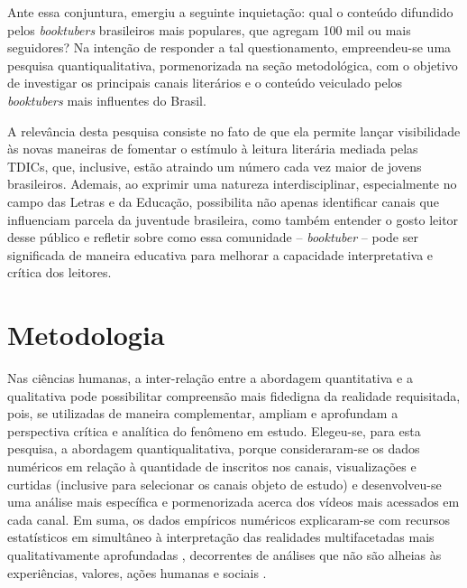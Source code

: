 \documentclass[portuguese]{textolivre}
\begin{document}
Ante essa conjuntura, emergiu a seguinte inquietação: qual o conteúdo
difundido pelos \emph{booktubers} brasileiros mais populares, que
agregam 100 mil ou mais seguidores? Na intenção de responder a tal
questionamento, empreendeu-se uma pesquisa quantiqualitativa,
pormenorizada na seção metodológica, com o objetivo de investigar os
principais canais literários e o conteúdo veiculado pelos
\emph{booktubers} mais influentes do Brasil.

A relevância desta pesquisa consiste no fato de que ela permite lançar
visibilidade às novas maneiras de fomentar o estímulo à leitura
literária mediada pelas TDICs, que, inclusive, estão atraindo um número
cada vez maior de jovens brasileiros. Ademais, ao exprimir uma natureza
interdisciplinar, especialmente no campo das Letras e da Educação,
possibilita não apenas identificar canais que influenciam parcela da
juventude brasileira, como também entender o gosto leitor desse público
e refletir sobre como essa comunidade -- \emph{booktuber} -- pode ser
significada de maneira educativa para melhorar a capacidade
interpretativa e crítica dos leitores.


\section{Metodologia}\label{sec-met}

Nas ciências humanas, a inter-relação entre a abordagem quantitativa e a
qualitativa pode possibilitar compreensão mais fidedigna da realidade
requisitada, pois, se utilizadas de maneira complementar, ampliam e
aprofundam a perspectiva crítica e analítica do fenômeno em estudo.
Elegeu-se, para esta pesquisa, a abordagem quantiqualitativa, porque
consideraram-se os dados numéricos em relação à quantidade de inscritos
nos canais, visualizações e curtidas (inclusive para selecionar os
canais objeto de estudo) e desenvolveu-se uma análise mais específica e
pormenorizada acerca dos vídeos mais acessados em cada canal. Em suma,
os dados empíricos numéricos explicaram-se com recursos estatísticos em
simultâneo à interpretação das realidades multifacetadas mais
qualitativamente aprofundadas \cite{RezendeSouza2017}, %
decorrentes de
análises que não são alheias às experiências, valores, ações humanas e
sociais \cite{Minayo2012}. %
\end{document}
